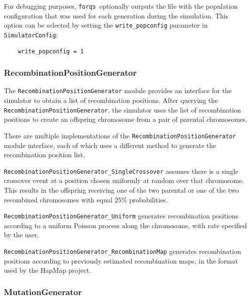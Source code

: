 \documentclass{article}
\newcommand{\forqs}[0]{\texttt{forqs }}
\begin{document}
For debugging purposes, \forqs optionally outputs the file  
with the population configuration that was used for each generation during the simulation.
This option can be selected by setting the \texttt{write\_popconfig} parameter in
\texttt{SimulatorConfig}:
\begin{small}
\begin{verbatim}
    write_popconfig = 1
\end{verbatim}
\end{small}



\subsubsection{RecombinationPositionGenerator}

\begin{sloppypar}
The \texttt{RecombinationPositionGenerator} module provides an interface for
the simulator to obtain a list of recombination positions.  After querying the
\texttt{RecombinationPositionGenerator}, the simulator uses the list of
recombination positions to create an offspring chromosome from a pair of
parental chromosomes.
\end{sloppypar}

\begin{sloppypar}
There are multiple implementations of the
\texttt{Recombination\-Position\-Generator} module interface, each of which uses a
different method to generate the recombination position list.
\end{sloppypar}

\texttt{Recombination\-Position\-Generator\-\_SingleCrossover} assumes there is 
a single crossover event at a position chosen uniformly at random over that
chromosome.  This results in the offspring receiving one of the two parental or
one of the two recombined chromosomes with equal 25\% probabilities.

\texttt{Recombination\-Position\-Generator\-\_Uniform} generates recombination
positions according to a uniform Poisson process along the chromosome, with
rate specified by the user.

\texttt{Recombination\-Position\-Generator\-\_Recombination\-Map} generates
recombination positions according to previously estimated recombination maps,
in the format used by the HapMap project.


\subsubsection{MutationGenerator}
\end{document}

